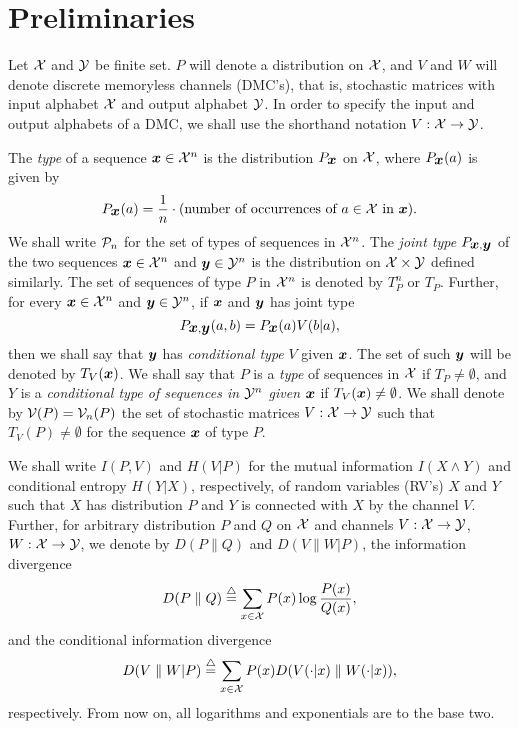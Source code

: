 \chapter{Preliminaries}
Let ${\cal X}$ and ${\cal Y}$ be finite set. $P$ will denote a distribution on ${\cal X}$,
and $V$ and $W$ will denote discrete memoryless channels (DMC's), that is,
stochastic matrices with input alphabet ${\cal X}$ and output alphabet ${\cal Y}$. 
In order to specify the input and output alphabets of a DMC, we shall use
the shorthand notation $V:{\cal X} \rightarrow {\cal Y}$. 

The {\it type\/} of a sequence $\mbox{\boldmath{$x$}}\in {\cal X}^n$ is the distribution $P_{\mbox{\boldmath{$x$}}}$
on ${\cal X}$, where $P_{\mbox{\boldmath{$x$}}}(a)$ is given by
\begin{equation}
  P_{\mbox{\boldmath{$x$}}}(a)=\frac{1}{n}\cdot(\mbox{number of occurrences of $a\in{\cal X}$ 
in $\mbox{\boldmath{$x$}}$}).
\end{equation}
We shall write ${\cal P}_n$ for the set of types of sequences in ${\cal X}^n$.
The {\it joint type\/} $P_{\mbox{\boldmath{$x$}},\mbox{\boldmath{$y$}}}$ of the two sequences $\mbox{\boldmath{$x$}}\in{\cal X}^n$ and
$\mbox{\boldmath{$y$}}\in{\cal Y}^n$ is the distribution on ${\cal X}\times{\cal Y}$ defined similarly.
The set of sequences of type $P$ in ${\cal X}^n$ is denoted by $T^n_P$ or
$T_P$. Further, for every $\mbox{\boldmath{$x$}}\in{\cal X}^n$ and $\mbox{\boldmath{$y$}}\in{\cal Y}^n$, if $\mbox{\boldmath{$x$}}$ and
$\mbox{\boldmath{$y$}}$ has joint type
\begin{equation}
 P_{\mbox{\boldmath{$x$}},\mbox{\boldmath{$y$}}}(a,b)=P_{\mbox{\boldmath{$x$}}}(a)V(b|a),
\end{equation}
then we shall say that $\mbox{\boldmath{$y$}}$ has {\it conditional type\/} $V$ given $\mbox{\boldmath{$x$}}$.
The set of such $\mbox{\boldmath{$y$}}$ will be denoted by $T_V(\mbox{\boldmath{$x$}})$. We shall say that $P$
is a {\it type} of sequences in ${\cal X}$ if $T_P\neq \emptyset$, and $Y$ 
is a {\it conditional type of sequences in ${\cal Y}^n$ given $\mbox{\boldmath{$x$}}$\/}  if 
$T_V(\mbox{\boldmath{$x$}})\neq \emptyset$. We shall denote by ${\cal V}(P)={\cal V}_n(P)$
the set of stochastic matrices $V:{\cal X}\rightarrow {\cal Y}$ such that
$T_V(P)\neq\emptyset$ for the sequence $\mbox{\boldmath{$x$}}$ of type $P$.

We shall write $I(P,V)$ and $H(V|P)$ for the mutual information
$I(X\wedge Y)$ and conditional entropy $H(Y|X)$, respectively,
of random variables (RV's) $X$ and $Y$ such that $X$ has distribution $P$
and $Y$ is connected with $X$ by the channel $V$. Further, for arbitrary
distribution $P$ and $Q$ on ${\cal X}$ and channels $V:{\cal X} \rightarrow {\cal Y}$,
$W:{\cal X} \rightarrow {\cal Y}$, we denote by $D(P\parallel Q)$ and 
$D(V\parallel W|P)$, the information divergence
\begin{equation}
 D(P\parallel Q)\stackrel{\triangle}{=} \sum_{x\in {\cal X}}P(x)\log\frac{P(x)}{Q(x)},
\end{equation}
and the conditional information divergence
\begin{equation}
 D(V\parallel W|P) \stackrel{\triangle}{=} \sum_{x\in {\cal X}}P(x)D(V(\cdot|x)\parallel W(\cdot|x)),
\end{equation}
respectively. From now on, all logarithms and exponentials are to the base 
two.

